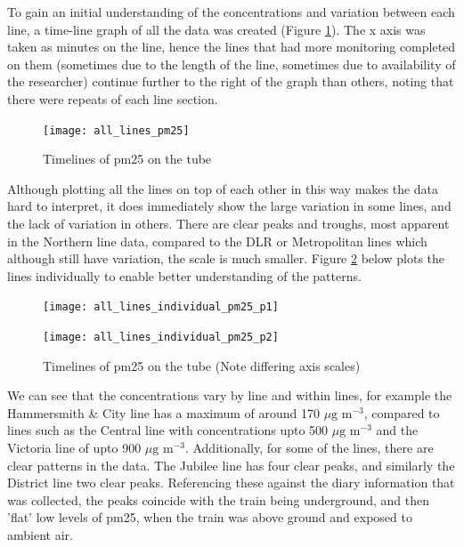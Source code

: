 To gain an initial understanding of the concentrations and variation between each line, a time-line graph of all the data was created (Figure \ref{fig:all_lines_pm25}). The x axis was taken as minutes on the line, hence the lines that had more monitoring completed on them (sometimes due to the length of the line, sometimes due to availability of the researcher) continue further to the right of the graph than others, noting that there were repeats of each line section.

\begin{figure}[H]
\centering
\texttt{[image: all\_lines\_pm25]}
\caption{Timelines of \gls{pm25} on the tube}
\label{fig:all_lines_pm25}
\end{figure}

Although plotting all the lines on top of each other in this way makes the data hard to interpret, it does immediately show the large variation in some lines, and the lack of variation in others. There are clear peaks and troughs, most apparent in the Northern line data, compared to the DLR or Metropolitan lines which although still have variation, the scale is much smaller. Figure \ref{fig:all_lines_individual_pm25_p1} below plots the lines individually to enable better understanding of the patterns.

\begin{figure}[H]
\centering
\texttt{[image: all\_lines\_individual\_pm25\_p1]}
\caption{}
\label{fig:all_lines_individual_pm25_p1}
\end{figure}

\begin{figure}[H]
\centering
\texttt{[image: all\_lines\_individual\_pm25\_p2]}
\caption{Timelines of \gls{pm25} on the tube (Note differing axis scales)}
\label{fig:all_lines_individual_pm25_p2}
\end{figure}

We can see that the concentrations vary by line and within lines, for example the Hammersmith \& City line has a maximum of around 170 $\mu \text{g m}^{-3}$, compared to lines such as the Central line with concentrations upto 500 $\mu \text{g m}^{-3}$ and the Victoria line of upto 900 $\mu \text{g m}^{-3}$. Additionally, for some of the lines, there are clear patterns in the data. The Jubilee line has four clear peaks, and similarly the District line two clear peaks. Referencing these against the diary information that was collected, the peaks coincide with the train being underground, and then 'flat' low levels of \gls{pm25}, when the train was above ground and exposed to ambient air.

